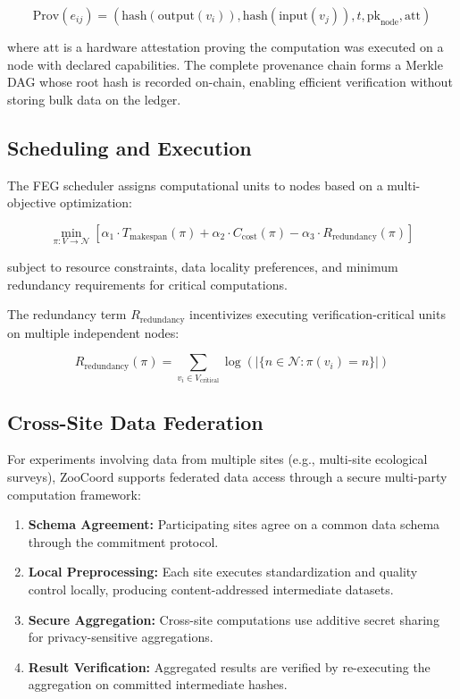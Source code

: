 \begin{equation}
    \text{Prov}(e_{ij}) = (\text{hash}(\text{output}(v_i)), \text{hash}(\text{input}(v_j)), t, \text{pk}_{\text{node}}, \text{att})
\end{equation}

\noindent where $\text{att}$ is a hardware attestation proving the computation was executed on a node with declared capabilities.
The complete provenance chain forms a Merkle DAG whose root hash is recorded on-chain, enabling efficient verification without storing bulk data on the ledger.

\subsection{Scheduling and Execution}

The FEG scheduler assigns computational units to nodes based on a multi-objective optimization:

\begin{equation}
    \min_{\pi: V \rightarrow \mathcal{N}} \left[\alpha_1 \cdot T_{\text{makespan}}(\pi) + \alpha_2 \cdot C_{\text{cost}}(\pi) - \alpha_3 \cdot R_{\text{redundancy}}(\pi)\right]
\end{equation}

\noindent subject to resource constraints, data locality preferences, and minimum redundancy requirements for critical computations.

The redundancy term $R_{\text{redundancy}}$ incentivizes executing verification-critical units on multiple independent nodes:

\begin{equation}
    R_{\text{redundancy}}(\pi) = \sum_{v_i \in V_{\text{critical}}} \log\left(|\{n \in \mathcal{N} : \pi(v_i) = n\}|\right)
\end{equation}

\subsection{Cross-Site Data Federation}

For experiments involving data from multiple sites (e.g., multi-site ecological surveys), ZooCoord supports federated data access through a secure multi-party computation framework:

\begin{enumerate}[leftmargin=*]
    \item \textbf{Schema Agreement:} Participating sites agree on a common data schema through the commitment protocol.
    \item \textbf{Local Preprocessing:} Each site executes standardization and quality control locally, producing content-addressed intermediate datasets.
    \item \textbf{Secure Aggregation:} Cross-site computations use additive secret sharing for privacy-sensitive aggregations.
    \item \textbf{Result Verification:} Aggregated results are verified by re-executing the aggregation on committed intermediate hashes.
\end{enumerate}

